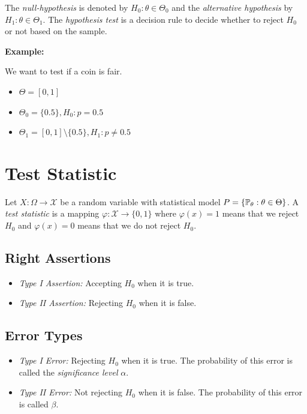The \emph{null-hypothesis} is denoted by \(H_0: \theta \in \Theta_0\) and the \emph{alternative hypothesis} by \(H_1: \theta \in \Theta_1\).
The \emph{hypothesis test} is a decision rule to decide whether to reject \(H_0\) or not based on the sample.

\textbf{Example:}

We want to test if a coin is fair. 

\begin{itemize}

    \item \(\Theta = [0,1]\)

    \item \(\Theta_0 = \{0.5\}, H_0: p = 0.5\)

    \item \(\Theta_1 = [0,1] \setminus \{0.5\}, H_1: p \ne 0.5\)

\end{itemize} 

\section{Test Statistic}

Let \(X: \Omega \to \mathcal{X}\) be a random variable with statistical model \(P = \{\mathbb{P}_\theta : \theta \in \Theta\}\). 
A \emph{test statistic} is a mapping \(\varphi: \mathcal{X} \to \{0,1\}\) where \(\varphi(x) = 1\) means that we reject \(H_0\) and \(\varphi(x) = 0\) 
means that we do not reject \(H_0\).

\subsection{Right Assertions}

\begin{itemize}

    \item \emph{Type I Assertion:} Accepting \(H_0\) when it is true. 

    \item \emph{Type II Assertion:} Rejecting \(H_0\) when it is false. 

\end{itemize}

\subsection{Error Types}

\begin{itemize}

    \item \emph{Type I Error:} Rejecting \(H_0\) when it is true. The probability of this error is called the \emph{significance level} \(\alpha\).

    \item \emph{Type II Error:} Not rejecting \(H_0\) when it is false. The probability of this error is called \(\beta\).

\end{itemize}

